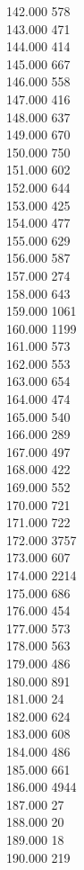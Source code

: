 { 142.000	578 \\
 143.000	471 \\
 144.000	414 \\
 145.000	667 \\
 146.000	558 \\
 147.000	416 \\
 148.000	637 \\
 149.000	670 \\
 150.000	750 \\
 151.000	602 \\
 152.000	644 \\
 153.000	425 \\
 154.000	477 \\
 155.000	629 \\
 156.000	587 \\
 157.000	274 \\
 158.000	643 \\
 159.000	1061 \\
 160.000	1199 \\
 161.000	573 \\
 162.000	553 \\
 163.000	654 \\
 164.000	474 \\
 165.000	540 \\
 166.000	289 \\
 167.000	497 \\
 168.000	422 \\
 169.000	552 \\
 170.000	721 \\
 171.000	722 \\
 172.000	3757 \\
 173.000	607 \\
 174.000	2214 \\
 175.000	686 \\
 176.000	454 \\
 177.000	573 \\
 178.000	563 \\
 179.000	486 \\
 180.000	891 \\
 181.000	24 \\
 182.000	624 \\
 183.000	608 \\
 184.000	486 \\
 185.000	661 \\
 186.000	4944 \\
 187.000	27 \\
 188.000	20 \\
 189.000	18 \\
 190.000	219 \\
}
